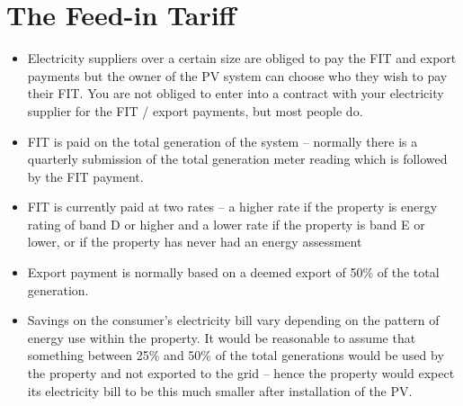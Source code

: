 \documentclass{article}
\begin{document}
\section{The Feed-in Tariff}
\begin{itemize}
\item	Electricity suppliers over a certain size are obliged to pay the FIT and export payments but the owner of the PV system can choose who they wish to pay their FIT. You are not obliged to enter into a contract with your electricity supplier for the FIT / export payments, but most people do.
\item	FIT is paid on the total generation of the system – normally there is a quarterly submission of the total generation meter reading which is followed by the FIT payment. 
\item	FIT is currently paid at two rates – a higher rate if the property is energy rating of band D or higher and a lower rate if the property is band E or lower, or if the property has never had an energy assessment
\item	Export payment is normally based on a deemed export of 50\% of the total generation.
\item	Savings on the consumer’s electricity bill vary depending on the pattern of energy use within the property. It would be reasonable to assume that something between 25\% and 50\% of the total generations would be used by the property and not exported to the grid – hence the property would expect its electricity bill to be this much smaller after installation of the PV.
\end{itemize}
\end{document}
